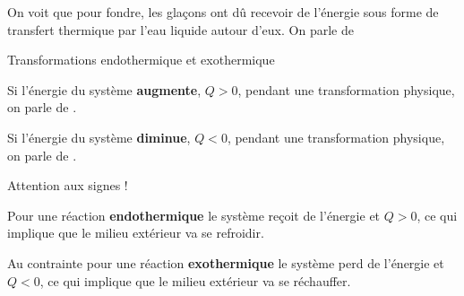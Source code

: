 

\newpage
\vspace*{-12pt}

On voit que pour fondre, les glaçons ont dû recevoir de l'énergie sous forme de transfert thermique par l'eau liquide autour d'eux.
On parle de 

\begin{doc}{Transformations endothermique et exothermique}
  \vspace*{-20pt}
  \begin{encart}
    \begin{listePoints}
      \item Si l'énergie du système \textbf{augmente}, $Q > 0$, pendant une transformation physique, on parle de .
      \item Si l'énergie du système \textbf{diminue}, $Q < 0$, pendant une transformation physique, on parle de .
    \end{listePoints}
  \end{encart}
  \begin{center}
  \end{center}
  \attention Attention aux signes !
  
  \begin{listePoints}
    \item Pour une réaction \textbf{endothermique} le système reçoit de l'énergie et $Q > 0$, ce qui implique que le milieu extérieur va se refroidir. 
    \item Au contrainte pour une réaction \textbf{exothermique} le système perd de l'énergie et $Q < 0$, ce qui implique que le milieu extérieur va se réchauffer.
  \end{listePoints}
\end{doc}